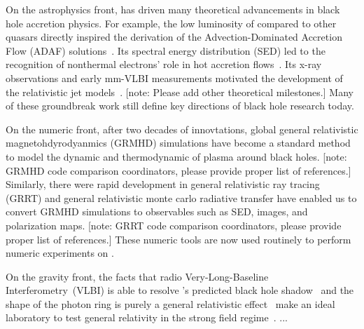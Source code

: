 \documentclass[twocolumn,tighten,dvipsnames]{aastex63}
\newcommand\note[1]{{\color{OliveGreen}[note: #1]}}
\begin{document}
On the astrophysics front, \sgra has driven many theoretical
advancements in black hole accretion physics.
For example, the low luminosity of \sgra compared to other quasars
directly inspired the derivation of the Advection-Dominated Accretion
Flow (ADAF) solutions~\citep{1994ApJ...428L..13N, 1995ApJ...444..231N,
  1995ApJ...452..710N, 1996A&AS..120C.287N, 1998ApJ...492..554N}.
Its spectral energy distribution (SED) led to the recognition of
nonthermal electrons' role in hot accretion
flows~\citep{2000ApJ...541..234O}.
Its x-ray observations and early mm-VLBI measurements motivated the
development of the relativistic jet models~\citep{2000A&A...362..113F,
  2004A&A...414..895F, 2005ApJ...635.1203M}.
\note{Please add other theoretical milestones.}
Many of these groundbreak work still define key directions of black
hole research today.

On the numeric front, after two decades of innovtations, global
general relativistic magnetohdyrodyanmics (GRMHD) simulations
\citep[e.g.,][]{2000ApJ...528..462H, 2003ApJ...589..458D,
  2003ApJ...589..444G, 2007CQGra..24S.235G, 2012ApJS..201....9F,
  2014ApJ...796...22F, 2016ApJS..225...22W, 2017ApJS..231...17A,
  2018JPhCS1031a2008O, 2019A&A...629A..61O, 2019ApJS..243...26P} have
become a standard method to model the dynamic and thermodynamic of
plasma around black holes.
\note{GRMHD code comparison coordinators, please provide proper list
  of references.}
Similarly, there were rapid development in general relativistic ray
tracing (GRRT) \citep[e.g.,][]{2009ApJ...696.1616D,
  2012ApJ...745....1P, 2013ApJ...777...11S, 2013ApJ...777...13C,
  2016MNRAS.462..115D, 2016ApJ...820..105P, 2018ApJ...867...59C,
  2018A&A...613A...2B, 2020ApJ...897..148G, 2020arXiv200703045B} and
general relativistic monte carlo radiative transfer
\citep{2009ApJS..184..387D, 2020MNRAS.491.4807M} have enabled us to
convert GRMHD simulations to observables such as SED, images, and
polarization maps.
\note{GRRT code comparison coordinators, please provide proper list of
  references.}
These numeric tools are now used routinely to perform numeric
experiments on \sgra.

On the gravity front, the facts that radio Very-Long-Baseline
Interferometry~(VLBI) is able to resolve \sgra's predicted black hole
shadow~\citep{2000ApJ...528L..13F} and the shape of the photon ring is
purely a general relativistic effect~\citep{2010ApJ...718..446J} make
\sgra an ideal laboratory to test general relativity in the strong
field regime~\citep{2010ApJ...718..446J, 2014ApJ...784....7B,
  2015ApJ...802...63B, 2015ApJ...814..115P, 2016ApJ...818..121P,
  2016PhRvL.117i1101J, 2019GReGr..51..137P}.
...
\end{document}

